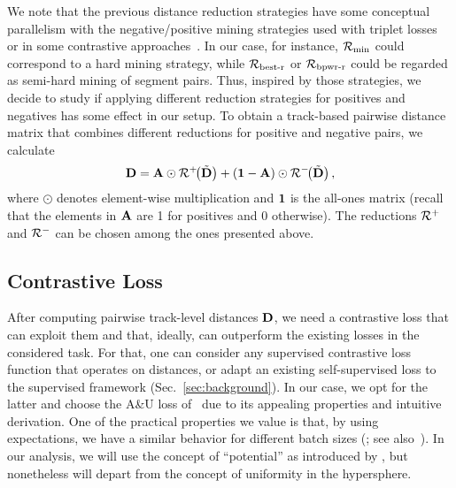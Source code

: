 We note that the previous distance reduction strategies have some conceptual parallelism with the negative/positive mining strategies used with triplet losses~\cite{schroff_facenet_2015} or in some contrastive approaches~\citep[cf.][]{kalantidis_hard_2020}. In our case, for instance, $\mathcal{R}_{\text{min}}$ could correspond to a hard mining strategy, while $\mathcal{R}_{\text{best-r}}$ or $\mathcal{R}_{\text{bpwr-r}}$ could be regarded as semi-hard mining of segment pairs. Thus, inspired by those strategies, we decide to study if applying different reduction strategies for positives and negatives has some effect in our setup. To obtain a track-based pairwise distance matrix that combines different reductions for positive and negative pairs, we calculate
\begin{equation}
\textbf{D} = \textbf{A}\odot \mathcal{R}^+\!\!\left( \tilde{\textbf{D}} \right) + \left(\textbf{1} - \textbf{A}\right)\odot \mathcal{R}^-\!\!\left( \tilde{\textbf{D}} \right) ,
\label{eq:distreduced}
\end{equation}
where $\odot$ denotes element-wise multiplication and $\textbf{1}$ is the all-ones matrix (recall that the elements in $\textbf{A}$ are 1 for positives and 0 otherwise). The reductions $\mathcal{R}^+$ and $\mathcal{R}^-$ can be chosen among the ones presented above.

 
\subsection{Contrastive Loss}
\label{sec:method_loss}

After computing pairwise track-level distances $\textbf{D}$, we need a contrastive loss that can exploit them and that, ideally, can outperform the existing losses in the considered task. For that, one can consider any supervised contrastive loss function that operates on distances, or adapt an existing self-supervised loss to the supervised framework (Sec.~\ref{sec:background}). In our case, we opt for the latter and choose the A\&U loss of~\citet{wang_understanding_2020} due to its appealing properties and intuitive derivation. One of the practical properties we value is that, by using expectations, we have a similar behavior for different batch sizes (\citealt{wang_understanding_2020}; see also~\citealt{koromilas_bridging_2024}). In our analysis, we will use the concept of ``potential'' as introduced by \citet{wang_understanding_2020}, but nonetheless will depart from the concept of uniformity in the hypersphere.

